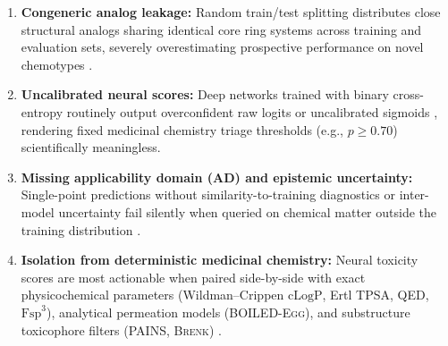 \documentclass[10pt,twocolumn,letterpaper]{article}
\begin{document}
\begin{enumerate}
  \item \textbf{Congeneric analog leakage:} Random train/test splitting distributes close structural analogs sharing identical core ring systems across training and evaluation sets, severely overestimating prospective performance on novel chemotypes \citep{wu2018moleculenet,bemis1996properties}.
  \item \textbf{Uncalibrated neural scores:} Deep networks trained with binary cross-entropy routinely output overconfident raw logits or uncalibrated sigmoids \citep{guo2017calibration}, rendering fixed medicinal chemistry triage thresholds (e.g., $p \ge 0.70$) scientifically meaningless.
  \item \textbf{Missing applicability domain (\textsc{AD}) and epistemic uncertainty:} Single-point predictions without similarity-to-training diagnostics or inter-model uncertainty fail silently when queried on chemical matter outside the training distribution \citep{sheridan2004similarity,lakshminarayanan2017simple}.
  \item \textbf{Isolation from deterministic medicinal chemistry:} Neural toxicity scores are most actionable when paired side-by-side with exact physicochemical parameters (Wildman–Crippen $\mathrm{cLogP}$, Ertl \textsc{TPSA}, \textsc{QED}, $\mathrm{Fsp}^3$), analytical permeation models (\textsc{BOILED-Egg}), and substructure toxicophore filters (\textsc{PAINS}, \textsc{Brenk}) \citep{daina2016boiled,bickerton2012quantifying,baell2010new,brenk2008lessons}.
\end{enumerate}
\end{document}

